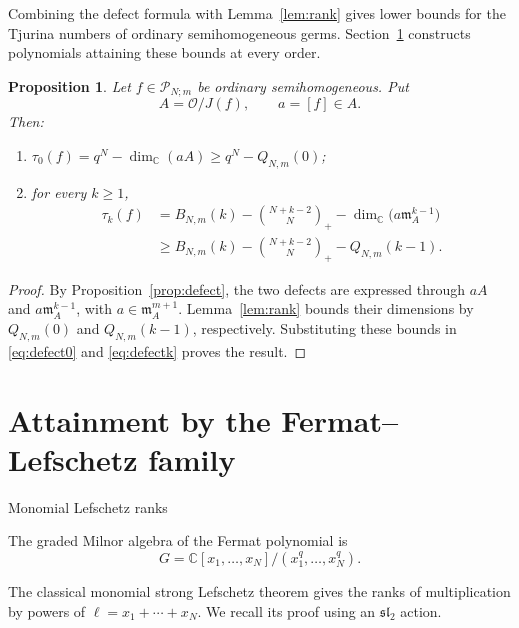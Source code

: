 \documentclass[12pt,reqno]{amsart}
\makeatletter
\renewcommand\subsection{\@startsection{subsection}{2}%
  \z@{.8\linespacing\@plus.3\linespacing}{.35\linespacing}%
  {\normalfont\bfseries}}
\newcommand{\C}{\mathbb C}
\newcommand{\mm}{\mathfrak m}
\newcommand{\tbin}[2]{\binom{#1}{#2}_{\!+}}
\newcommand{\Pall}{\mathcal P_{N;m}}
\newcommand{\OO}{\mathcal O}
\newtheorem{proposition}[theorem]{Proposition}
\theoremstyle{definition}
\makeatother
\begin{document}
Combining the defect formula with Lemma~\ref{lem:rank} gives lower
bounds for the Tjurina numbers of ordinary semihomogeneous germs.
Section~\ref{sec:lefschetz} constructs polynomials attaining these bounds
at every order.

 \begin{proposition}\label{prop:semihomogeneous-values-bounds}
Let $f\in\Pall$ be ordinary semihomogeneous. Put
\[
A=\OO/J(f),\qquad a=[f]\in A.
\]
Then:
\begin{enumerate}
\item $\tau_0(f)=q^N-\dim_\C(aA)\ge q^N-Q_{N,m}(0)$;
\item for every $k\geq1$,
\begin{align*}
\tau_k(f)
& =
B_{N,m}(k)
-\tbin{N+k-2}{N}
-\dim_\C\big(a\mm_A^{k-1}\big) \\
& \ge
B_{N,m}(k)
-\tbin{N+k-2}{N}
-Q_{N,m}(k-1).
\end{align*}
\end{enumerate}
\end{proposition}
\begin{proof} 
By Proposition~\ref{prop:defect}, the two defects are expressed through
$aA$ and $a\mm_A^{k-1}$, with $a\in\mm_A^{m+1}$.
Lemma~\ref{lem:rank} bounds their dimensions by $Q_{N,m}(0)$ and
$Q_{N,m}(k-1)$, respectively. Substituting these bounds in
\eqref{eq:defect0} and \eqref{eq:defectk} proves the result.
\end{proof}

 


\section{Attainment by the Fermat--Lefschetz family}
\label{sec:lefschetz}

 

 

\subsection{Monomial Lefschetz ranks}

 
The graded Milnor algebra of the Fermat polynomial is
\[
 G=\C[x_1,\ldots,x_N]/(x_1^q,\ldots,x_N^q).
\]

The classical monomial strong Lefschetz theorem \cite{Stanley,PhuongTran}
gives the ranks of multiplication by powers of $\ell=x_1+\cdots+x_N$.
We recall its proof using an $\mathfrak{sl}_2$ action. 
\end{document}
